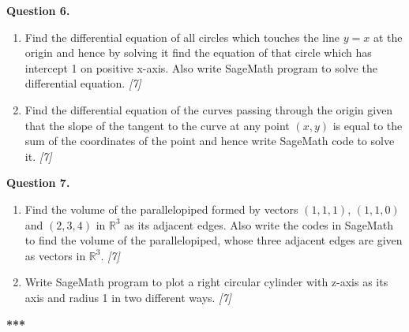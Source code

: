 \documentclass[11pt,a4paper]{article}
\newcommand{\pts}[1]{\hfill \textit{[#1]}}
\begin{document}
\bigskip

\noindent \textbf{Question 6.}
\begin{enumerate}[label=(\alph*)]
  \item Find the differential equation of all circles which touches the line $y = x$ at the origin and hence by solving it find the equation of that circle which has intercept 1 on positive x-axis. Also write SageMath program to solve the differential equation. \pts{7}
  \item Find the differential equation of the curves passing through the origin given that the slope of the tangent to the curve at any point $(x, y)$ is equal to the sum of the coordinates of the point and hence write SageMath code to solve it. \pts{7}
\end{enumerate}

\bigskip

\noindent \textbf{Question 7.}
\begin{enumerate}[label=(\alph*)]
  \item Find the volume of the parallelopiped formed by vectors $(1,1,1)$, $(1,1,0)$ and $(2,3,4)$ in $\mathbb{R}^3$ as its adjacent edges. Also write the codes in SageMath to find the volume of the parallelopiped, whose three adjacent edges are given as vectors in $\mathbb{R}^3$. \pts{7}
  \item Write SageMath program to plot a right circular cylinder with z-axis as its axis and radius 1 in two different ways. \pts{7}
\end{enumerate}

\bigskip
\begin{center}
  \textbf{***}
\end{center}
\end{document}
